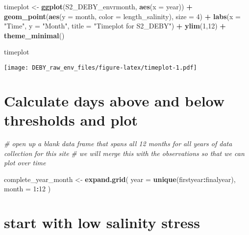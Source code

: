 \documentclass[
]{article}
\newenvironment{Shaded}{\begin{snugshade}}{\end{snugshade}}
\newcommand{\AttributeTok}[1]{\textcolor[rgb]{0.13,0.29,0.53}{#1}}
\newcommand{\CommentTok}[1]{\textcolor[rgb]{0.56,0.35,0.01}{\textit{#1}}}
\newcommand{\DecValTok}[1]{\textcolor[rgb]{0.00,0.00,0.81}{#1}}
\newcommand{\FunctionTok}[1]{\textcolor[rgb]{0.13,0.29,0.53}{\textbf{#1}}}
\newcommand{\NormalTok}[1]{#1}
\newcommand{\OtherTok}[1]{\textcolor[rgb]{0.56,0.35,0.01}{#1}}
\newcommand{\SpecialCharTok}[1]{\textcolor[rgb]{0.81,0.36,0.00}{\textbf{#1}}}
\newcommand{\StringTok}[1]{\textcolor[rgb]{0.31,0.60,0.02}{#1}}
\begin{document}
\begin{Shaded}
\begin{Highlighting}[]
\NormalTok{timeplot }\OtherTok{\textless{}{-}} \FunctionTok{ggplot}\NormalTok{(S2\_DEBY\_envrmonth, }\FunctionTok{aes}\NormalTok{(}\AttributeTok{x =}\NormalTok{ year)) }\SpecialCharTok{+}
    \FunctionTok{geom\_point}\NormalTok{(}\FunctionTok{aes}\NormalTok{(}\AttributeTok{y =}\NormalTok{ month, }\AttributeTok{color =}\NormalTok{ length\_salinity), }\AttributeTok{size =} \DecValTok{4}\NormalTok{) }\SpecialCharTok{+}
    \FunctionTok{labs}\NormalTok{(}\AttributeTok{x =} \StringTok{"Time"}\NormalTok{, }\AttributeTok{y =} \StringTok{"Month"}\NormalTok{, }\AttributeTok{title =} \StringTok{"Timeplot for S2\_DEBY"}\NormalTok{) }\SpecialCharTok{+}
    \FunctionTok{ylim}\NormalTok{(}\DecValTok{1}\NormalTok{,}\DecValTok{12}\NormalTok{) }\SpecialCharTok{+}
    \FunctionTok{theme\_minimal}\NormalTok{()}

\NormalTok{timeplot}
\end{Highlighting}
\end{Shaded}

\texttt{[image: DEBY\_raw\_env\_files/figure-latex/timeplot-1.pdf]}

\hypertarget{calculate-days-above-and-below-thresholds-and-plot}{%
\section{Calculate days above and below thresholds and
plot}\label{calculate-days-above-and-below-thresholds-and-plot}}

\begin{Shaded}
\begin{Highlighting}[]
\CommentTok{\# open up a blank data frame that spans all 12 months for all years of data collection for this site}
\CommentTok{\# we will merge this with the observations so that we can plot over time }

\NormalTok{complete\_year\_month }\OtherTok{\textless{}{-}} \FunctionTok{expand.grid}\NormalTok{(}
  \AttributeTok{year =} \FunctionTok{unique}\NormalTok{(firstyear}\SpecialCharTok{:}\NormalTok{finalyear),}
  \AttributeTok{month =} \DecValTok{1}\SpecialCharTok{:}\DecValTok{12}
\NormalTok{)}
\end{Highlighting}
\end{Shaded}

\hypertarget{start-with-low-salinity-stress}{%
\section{start with low salinity
stress}\label{start-with-low-salinity-stress}}
\end{document}
